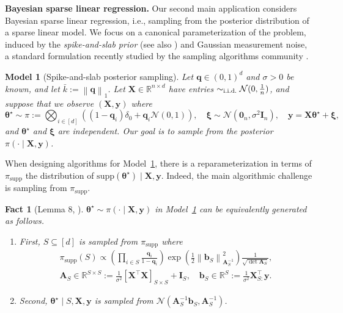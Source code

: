 \documentclass[11pt]{article}
\newtheorem{fact}{Fact}
\newtheorem{model}{Model}
\newcommand{\defeq}{:=}
\newcommand{\norm}[1]{\left\lVert#1\right\rVert}
\newcommand{\R}{\mathbb{R}}
\newcommand{\half}{\frac{1}{2}}
\newcommand{\1}{\mathbf{1}}
\newcommand{\0}{\mathbf{0}}
\newcommand{\Nor}{\mathcal{N}}
\newcommand{\id}{\mathbf{I}}
\newcommand{\Par}[1]{\left(#1\right)}
\newcommand{\Brack}[1]{\left[#1\right]}
\newcommand{\supp}{\mathrm{supp}}
\newcommand{\vth}{\boldsymbol{\theta}}
\newcommand{\vxi}{\boldsymbol{\xi}}
\newcommand{\sig}{\sigma}
\newcommand{\onenorm}[1]{\norm{#1}_1}
\newcommand{\vzero}{\mathbf{0}}
\newcommand{\vths}{\vth^\star}
\newcommand{\pisupp}{\pi_{\supp}}
\newcommand{\simiid}{\sim_{\textup{i.i.d.}}}
\newcommand{\bark}{\bar{k}}
\newcommand{\ma}{{\mathbf{A}}}
\newcommand{\mx}{{\mathbf{X}}}
\newcommand{\mxtx}{\mx^\top \mx}
\newcommand{\vb}{{\mathbf{b}}}
\newcommand{\vq}{{\mathbf{q}}}
\newcommand{\vy}{{\mathbf{y}}}
\newcommand{\calN}{{\mathcal{N}}}
\begin{document}
\textbf{Bayesian sparse linear regression.} Our second main application considers Bayesian sparse linear regression, i.e., sampling from the posterior distribution of a sparse linear model. We focus on a canonical parameterization of the problem, induced by the \emph{spike-and-slab prior} \cite{MitchellB88, GeorgeM93} (see also \cite{Chipman96, Geweke96}) and Gaussian measurement noise, a standard formulation recently studied by the sampling algorithms community \cite{KumarSTZ25, MontanariW26}.

\begin{model}[Spike-and-slab posterior sampling]\label{model:sas_basic}
Let $\vq \in (0, 1)^d$ and $\sigma > 0$ be known, and let $\bark \defeq \onenorm{\vq}$. Let $\mx \in \R^{n \times d}$ have entries $\simiid \calN(0, \frac 1 n)$, and suppose that we observe $(\mx, \vy)$ where 
\begin{equation}\label{eq:slr}\vths \sim \pi \defeq \bigotimes_{i \in [d]} \Par{(1 - \vq_i) \delta_0 + \vq_i \Nor(0, 1)},\quad \vxi \sim \Nor(\vzero_n, \sigma^2 \id_n),\quad\vy = \mx \vths + \vxi,\end{equation}
and $\vth^\star$ and $\vxi$ are independent. Our goal is to sample from the posterior $\pi(\cdot \mid \mx, \vy)$.
\end{model}

When designing algorithms for Model~\ref{model:sas_basic}, there is a reparameterization in terms of $\pisupp$ the distribution of $\supp(\vths) \mid \mx, \vy$. Indeed, the main algorithmic challenge is sampling from $\pisupp$. 

\begin{fact}[Lemma 8, \cite{KumarSTZ25}]\label{fact:pisupp}
$\vths \sim \pi(\cdot \mid \mx, \vy)$ in Model~\ref{model:sas_basic} can be equivalently generated as follows.
\begin{enumerate}
    \item First, $S \subseteq [d]$ is sampled from $\pisupp$ where     \begin{equation}\label{eq:pisupp_def}\begin{gathered}\pisupp(S) \propto \Par{\prod_{i \in S} \frac{\vq_i}{1 - \vq_i}}\exp\Par{\half\norm{\vb_S}_{\ma_S^{-1}}^2} \frac 1 {\sqrt{\det \ma_S}}, \\
\ma_S \in \R^{S \times S} \defeq \frac 1 {\sig^2}\Brack{\mxtx}_{S \times S} + \id_S,\quad  \vb_S \in \R^S \defeq \frac 1 {\sig^2}\mx_{S:}^\top \vy.\end{gathered}\end{equation}
    \item Second, $\vths \mid S, \mx, \vy$ is sampled from $\Nor(\ma_S^{-1} \vb_S, \ma_S^{-1})$.
\end{enumerate}
\end{fact}
\end{document}
